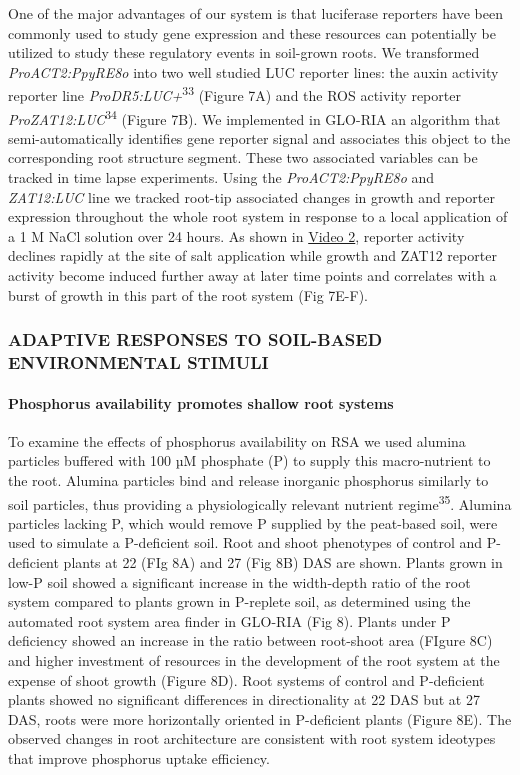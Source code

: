 \documentclass[]{article}
\begin{document}
One of the major advantages of our system is that luciferase reporters
have been commonly used to study gene expression and these resources can
potentially be utilized to study these regulatory events in soil-grown
roots. We transformed \emph{ProACT2:PpyRE8o} into two well studied LUC
reporter lines: the auxin activity reporter line
\emph{ProDR5:LUC+}\textsuperscript{33} (Figure 7A) and the ROS activity
reporter \emph{ProZAT12:LUC}\textsuperscript{34} (Figure 7B). We
implemented in GLO-RIA an algorithm that semi-automatically identifies
gene reporter signal and associates this object to the corresponding
root structure segment. These two associated variables can be tracked in
time lapse experiments. Using the \emph{ProACT2:PpyRE8o} and
\emph{ZAT12:LUC} line we tracked root-tip associated changes in growth
and reporter expression throughout the whole root system in response to
a local application of a 1 M NaCl solution over 24 hours. As shown in
\href{https://www.dropbox.com/s/11td4zmhcw8yty6/Video_2.avi?dl=0}{Video
2}, reporter activity declines rapidly at the site of salt application
while growth and ZAT12 reporter activity become induced further away at
later time points and correlates with a burst of growth in this part of
the root system (Fig 7E-F).

\subsubsection{ADAPTIVE RESPONSES TO SOIL-BASED ENVIRONMENTAL
STIMULI}\label{adaptive-responses-to-soil-based-environmental-stimuli}

\paragraph{Phosphorus availability promotes shallow root
systems}\label{phosphorus-availability-promotes-shallow-root-systems}

To examine the effects of phosphorus availability on RSA we used alumina
particles buffered with 100 µM phosphate (P) to supply this
macro-nutrient to the root. Alumina particles bind and release inorganic
phosphorus similarly to soil particles, thus providing a physiologically
relevant nutrient regime\textsuperscript{35}. Alumina particles lacking
P, which would remove P supplied by the peat-based soil, were used to
simulate a P-deficient soil. Root and shoot phenotypes of control and
P-deficient plants at 22 (FIg 8A) and 27 (Fig 8B) DAS are shown. Plants
grown in low-P soil showed a significant increase in the width-depth
ratio of the root system compared to plants grown in P-replete soil, as
determined using the automated root system area finder in GLO-RIA (Fig
8). Plants under P deficiency showed an increase in the ratio between
root-shoot area (FIgure 8C) and higher investment of resources in the
development of the root system at the expense of shoot growth (Figure
8D). Root systems of control and P-deficient plants showed no
significant differences in directionality at 22 DAS but at 27 DAS, roots
were more horizontally oriented in P-deficient plants (Figure 8E). The
observed changes in root architecture are consistent with root system
ideotypes that improve phosphorus uptake efficiency.
\end{document}
